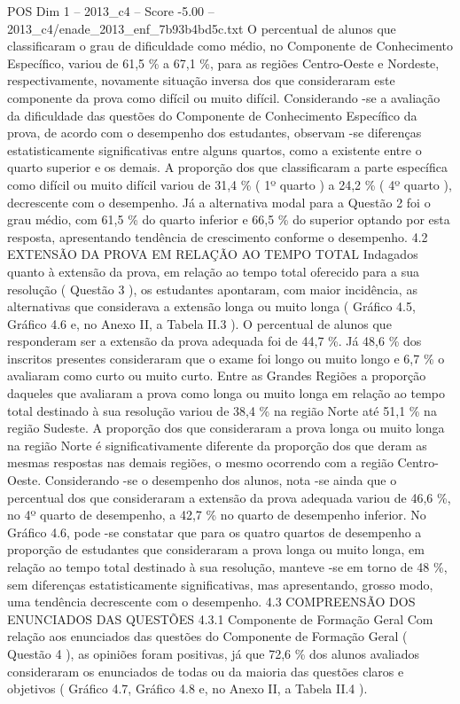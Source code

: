 \begin{textsample}{POS Dim 1 – 2013\_c4 – Score -5.00 – 2013\_c4/enade\_2013\_enf\_7b93b4bd5c.txt}
O percentual de alunos que classificaram o grau de dificuldade como médio, no Componente de Conhecimento Específico, variou de 61,5 \% a 67,1 \%, para as regiões Centro-Oeste e Nordeste, respectivamente, novamente situação inversa dos que consideraram este componente da prova como difícil ou muito difícil.
Considerando -se a avaliação da dificuldade das questões do Componente de Conhecimento Específico da prova, de acordo com o desempenho dos estudantes, observam -se diferenças estatisticamente significativas entre alguns quartos, como a existente entre o quarto superior e os demais.
A proporção dos que classificaram a parte específica como difícil ou muito difícil variou de 31,4 \% ( 1º quarto ) a 24,2 \% ( 4º quarto ), decrescente com o desempenho.
Já a alternativa modal para a Questão 2 foi o grau médio, com 61,5 \% do quarto inferior e 66,5 \% do superior optando por esta resposta, apresentando tendência de crescimento conforme o desempenho. 4.2 EXTENSÃO DA PROVA EM RELAÇÃO AO TEMPO TOTAL Indagados quanto à extensão da prova, em relação ao tempo total oferecido para a sua resolução ( Questão 3 ), os estudantes apontaram, com maior incidência, as alternativas que considerava a extensão longa ou muito longa ( Gráfico 4.5, Gráfico 4.6 e, no Anexo II, a Tabela II.3 ).
O percentual de alunos que responderam ser a extensão da prova adequada foi de 44,7 \%.
Já 48,6 \% dos inscritos presentes consideraram que o exame foi longo ou muito longo e 6,7 \% o avaliaram como curto ou muito curto.
Entre as Grandes Regiões a proporção daqueles que avaliaram a prova como longa ou muito longa em relação ao tempo total destinado à sua resolução variou de 38,4 \% na região Norte até 51,1 \% na região Sudeste.
A proporção dos que consideraram a prova longa ou muito longa na região Norte é significativamente diferente da proporção dos que deram as mesmas respostas nas demais regiões, o mesmo ocorrendo com a região Centro-Oeste.
Considerando -se o desempenho dos alunos, nota -se ainda que o percentual dos que consideraram a extensão da prova adequada variou de 46,6 \%, no 4º quarto de desempenho, a 42,7 \% no quarto de desempenho inferior.
No Gráfico 4.6, pode -se constatar que para os quatro quartos de desempenho a proporção de estudantes que consideraram a prova longa ou muito longa, em relação ao tempo total destinado à sua resolução, manteve -se em torno de 48 \%, sem diferenças estatisticamente significativas, mas apresentando, grosso modo, uma tendência decrescente com o desempenho. 4.3 COMPREENSÃO DOS ENUNCIADOS DAS QUESTÕES 4.3.1 Componente de Formação Geral Com relação aos enunciados das questões do Componente de Formação Geral ( Questão 4 ), as opiniões foram positivas, já que 72,6 \% dos alunos avaliados consideraram os enunciados de todas ou da maioria das questões claros e objetivos ( Gráfico 4.7, Gráfico 4.8 e, no Anexo II, a Tabela II.4 ).

\end{textsample}
